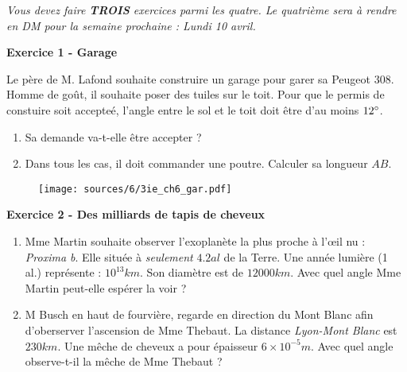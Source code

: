 \documentclass[10pt]{article}
\begin{document}
\textit{Vous devez faire \textbf{TROIS} exercices parmi les quatre. Le quatrième sera à rendre en DM pour la semaine prochaine : Lundi 10 avril.}


\begin{multicols}{2}
  
  \textbf{Exercice 1 - Garage}

  Le père de M. Lafond souhaite construire un garage pour garer sa Peugeot 308. Homme de goût, il souhaite poser des tuiles sur le toit. Pour que le permis de constuire soit accepteé, l'angle entre le sol et le toit doit être d'au moins $12\degree$.

  \begin{enumerate}
  \item[1.] Sa demande va-t-elle être accepter ?
  \item[2.] Dans tous les cas, il doit commander une poutre. Calculer sa longueur $AB$.
  \end{enumerate}

  \begin{figure}[H]
    \centering
    \texttt{[image: sources/6/3ie\_ch6\_gar.pdf]}
  \end{figure}

  

\end{multicols}

\begin{multicols}{2}
  \textbf{Exercice 2 - Des milliards de tapis de cheveux}

  \begin{enumerate}
  \item[1.] Mme Martin souhaite observer l'exoplanète la plus proche à l'œil nu : \textit{Proxima b}. Elle située à \textit{seulement} $4.2 al$ de la Terre. Une année lumière (1 al.) représente : $10^{13} km$. Son diamètre est de $12 000km$.
    Avec quel angle Mme Martin peut-elle espérer la voir ?

  \item[2.] M Busch en haut de fourvière, regarde en direction du Mont Blanc afin d'oberserver l'ascension de Mme Thebaut. La distance \textit{Lyon-Mont Blanc} est $230km$. Une mêche de cheveux a pour épaisseur $6 \times 10^{-5}m$.
    Avec quel angle observe-t-il la mêche de Mme Thebaut ?
  \end{enumerate}
\end{multicols}

\end{document}
